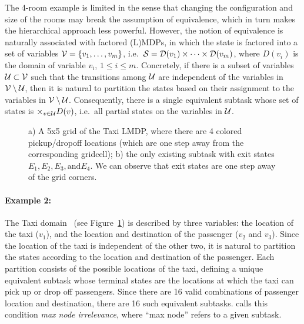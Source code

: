 The 4-room example is limited in the sense that changing the configuration and size of the rooms may break the assumption of equivalence, which in turn makes the hierarchical approach less powerful. However, the notion of equivalence is naturally associated with factored (L)MDPs, in which the state is factored into a set of variables $\mathcal{V}=\{v_1,\ldots,v_m\}$, i.e.~$\mathcal{S}=\mathcal{D}(v_1)\times\cdots\times\mathcal{D}(v_m)$, where $D(v_i)$ is the domain of variable $v_i$, $1\leq i\leq m$.
Concretely, if there is a subset of variables $\mathcal{U}\subset\mathcal{V}$ such that the transitions among $\mathcal{U}$ are independent of the variables in $\mathcal{V}\setminus\mathcal{U}$, then it is natural to partition the states based on their assignment to the variables in $\mathcal{V}\setminus\mathcal{U}$. Consequently, there is a single equivalent subtask whose set of states is $\times_{v\in\mathcal{U}}D(v)$, i.e.~all partial states on the variables in $\mathcal{U}$.


\begin{figure}[!t]
    \begin{center}
        
    \end{center}
    \caption{a) A 5x5 grid of the Taxi LMDP, where there are 4 colored pickup/dropoff locations (which are one step away from the corresponding gridcell); b) the only existing subtask with exit states $E_1,E_2,E_3, \text{and} E_4$. We can observe that exit states are one step away of the grid corners.} 
    \label{fig:domain_taxi}
\end{figure}
    

\paragraph{Example 2:} The Taxi domain~\citep{Dietterich2000} (see Figure~\ref{fig:domain_taxi}) is described by three variables: the location of the taxi ($v_1$), and the location and destination of the passenger ($v_2$ and $v_3$). Since the location of the taxi is independent of the other two, it is natural to partition the states according to the location and destination of the passenger. Each partition consists of the possible locations of the taxi, defining a unique equivalent subtask whose terminal states are the locations at which the taxi can pick up or drop off passengers. Since there are 16 valid combinations of passenger location and destination, there are 16 such equivalent subtasks.
\citep{Dietterich2000} calls this condition {\em max node irrelevance}, where ``max node'' refers to a given subtask.

